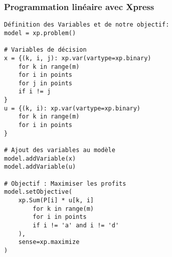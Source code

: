 \documentclass[a4paper, 12pt, DIV=12]{scrartcl}
\begin{document}
\subsubsection{Programmation linéaire avec Xpress}
\begin{minipage}{\textwidth}
\begin{verbatim}
Définition des Variables et de notre objectif:
model = xp.problem()

# Variables de décision
x = {(k, i, j): xp.var(vartype=xp.binary) 
    for k in range(m) 
    for i in points 
    for j in points 
    if i != j
}
u = {(k, i): xp.var(vartype=xp.binary) 
    for k in range(m) 
    for i in points
}

# Ajout des variables au modèle
model.addVariable(x)
model.addVariable(u)

# Objectif : Maximiser les profits
model.setObjective(
    xp.Sum(P[i] * u[k, i] 
        for k in range(m) 
        for i in points 
        if i != 'a' and i != 'd'
    ),
    sense=xp.maximize
)
\end{verbatim}
\end{minipage}%
\end{document}
